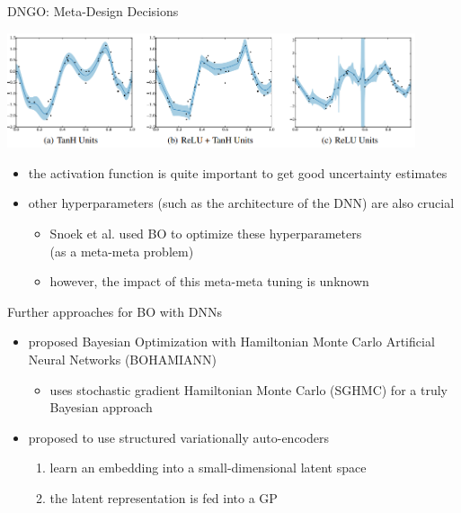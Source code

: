 \begin{frame}[c,fragile]{DNGO: Meta-Design Decisions~}

\centering
\includegraphics[width=0.9\textwidth]{images/dngo_activation.png}

\begin{itemize}
	\item the activation function is quite important to get good uncertainty estimates
	\item other hyperparameters (such as the architecture of the DNN) are also crucial
	\begin{itemize}
		\item Snoek et al. used BO to optimize these hyperparameters\\ (as a meta-meta problem)
		\item however, the impact of this meta-meta tuning is unknown
	\end{itemize}
\end{itemize}

\end{frame}

\begin{frame}[c,fragile]{Further approaches for BO with DNNs}

\begin{itemize}
	\item {} proposed  Bayesian Optimization with Hamiltonian Monte Carlo Artificial Neural
	Networks (BOHAMIANN) 
	\begin{itemize}
		\item uses stochastic gradient	Hamiltonian Monte Carlo (SGHMC) for a truly Bayesian approach 
	\end{itemize}
	\medskip
	\pause
	\item {} proposed to use structured variationally auto-encoders
	\begin{enumerate}
		\item learn an embedding into a small-dimensional latent space
		\item the latent representation is fed into a GP
	\end{enumerate}
\end{itemize}

\end{frame}

